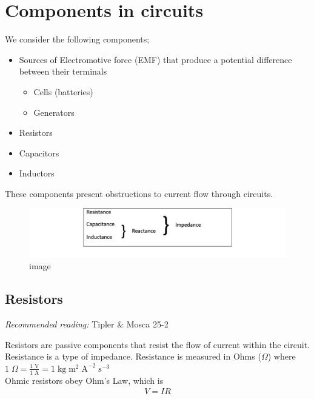 \documentclass[
]{book}
\begin{document}
\hypertarget{components-in-circuits}{%
\section{Components in circuits}\label{components-in-circuits}}

We consider the following components;

\begin{itemize}
\item
  Sources of Electromotive force (EMF) that produce a potential
  difference between their terminals

  \begin{itemize}
  \item
    Cells (batteries)
  \item
    Generators
  \end{itemize}
\item
  Resistors
\item
  Capacitors
\item
  Inductors
\end{itemize}

These components present obstructions to current flow through circuits.

\begin{figure}
\centering
\includegraphics[width=120mm,height=\textheight]{Figures/ances_summary.png}
\caption{image}
\end{figure}

\hypertarget{resistors}{%
\subsection{Resistors}\label{resistors}}

\emph{Recommended reading:} Tipler \& Mosca 25-2

Resistors are passive components that resist the flow of current within
the circuit. Resistance is a type of impedance. Resistance is measured
in Ohms (\(\Omega\)) where\\
\(1 \; \Omega = \frac{1 \; \text{V}}{1 \; \text{A}} = 1 \; \text{kg} \; \text{m}^2 \; \text{A}^{-2} \; \text{s}^{-3}\)\\
Ohmic resistors obey Ohm's Law, which is \[\begin{aligned}
V = IR
\end{aligned}\]
\end{document}
